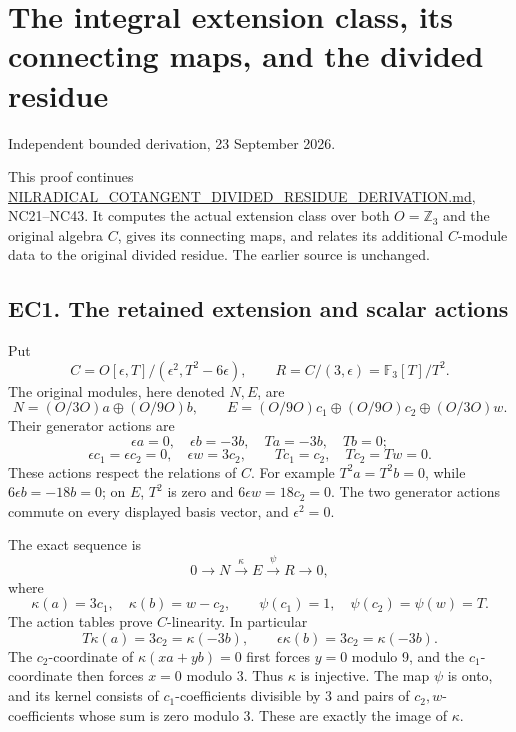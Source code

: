 \documentclass[
  10pt,
]{article}
\author{}
\date{}
\begin{document}
\section{The integral extension class, its connecting maps, and the
divided
residue}\label{the-integral-extension-class-its-connecting-maps-and-the-divided-residue}

Independent bounded derivation, 23 September 2026.

This proof continues
\url{NILRADICAL_COTANGENT_DIVIDED_RESIDUE_DERIVATION.md}, NC21--NC43. It
computes the actual extension class over both \(O=\mathbb Z_3\) and the
original algebra \(C\), gives its connecting maps, and relates its
additional \(C\)-module data to the original divided residue. The
earlier source is unchanged.

\subsection{EC1. The retained extension and scalar
actions}\label{ec1.-the-retained-extension-and-scalar-actions}

Put \[
C=O[\epsilon,T]/(\epsilon^2,T^2-6\epsilon),\qquad
R=C/(3,\epsilon)=\mathbb F_3[T]/T^2.
\tag{EC1}
\] The original modules, here denoted \(N,E\), are \[
N=(O/3O)a\oplus(O/9O)b,\qquad
E=(O/9O)c_1\oplus(O/9O)c_2\oplus(O/3O)w.
\tag{EC2}
\] Their generator actions are \[
\epsilon a=0,\quad\epsilon b=-3b,\quad
Ta=-3b,\quad Tb=0;
\tag{EC3}
\] \[
\epsilon c_1=\epsilon c_2=0,\quad\epsilon w=3c_2,\qquad
Tc_1=c_2,\quad Tc_2=Tw=0.
\tag{EC4}
\] These actions respect the relations of \(C\). For example
\(T^2a=T^2b=0\), while \(6\epsilon b=-18b=0\); on \(E\), \(T^2\) is zero
and \(6\epsilon w=18c_2=0\). The two generator actions commute on every
displayed basis vector, and \(\epsilon^2=0\).

The exact sequence is \[
0\longrightarrow N\xrightarrow{\kappa}E\xrightarrow{\psi}R
\longrightarrow0,
\tag{EC5}
\] where \[
\kappa(a)=3c_1,\quad\kappa(b)=w-c_2,\qquad
\psi(c_1)=1,\quad\psi(c_2)=\psi(w)=T.
\tag{EC6}
\] The action tables prove \(C\)-linearity. In particular \[
T\kappa(a)=3c_2=\kappa(-3b),\qquad
\epsilon\kappa(b)=3c_2=\kappa(-3b).
\] The \(c_2\)-coordinate of \(\kappa(xa+yb)=0\) first forces \(y=0\)
modulo 9, and the \(c_1\)-coordinate then forces \(x=0\) modulo 3. Thus
\(\kappa\) is injective. The map \(\psi\) is onto, and its kernel
consists of \(c_1\)-coefficients divisible by 3 and pairs of
\(c_2,w\)-coefficients whose sum is zero modulo 3. These are exactly the
image of \(\kappa\).
\end{document}

